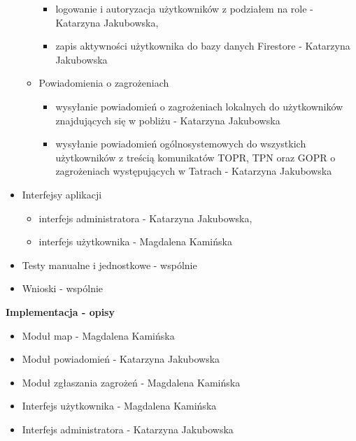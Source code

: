 \begin{itemize}
\begin{itemize}[label=$\circ$]
\begin{itemize}
                \item logowanie i autoryzacja użytkowników z podziałem na role - Katarzyna Jakubowska,
                \item zapis aktywności użytkownika do bazy danych Firestore - Katarzyna Jakubowska
            \end{itemize}
            \item Powiadomienia o zagrożeniach
            \begin{itemize}
                \item wysyłanie powiadomień o zagrożeniach lokalnych do użytkowników znajdujących się w pobliżu - Katarzyna Jakubowska
                \item wysyłanie powiadomień ogólnosystemowych do wszystkich użytkowników z treścią komunikatów TOPR, TPN oraz GOPR o zagrożeniach występujących w Tatrach - Katarzyna Jakubowska
            \end{itemize}
        \end{itemize}
        \item Interfejsy aplikacji
        \begin{itemize}[label=$\circ$]
            \item interfejs administratora - Katarzyna Jakubowska,
            \item interfejs użytkownika - Magdalena Kamińska
        \end{itemize}
        \item Testy manualne i jednostkowe - wspólnie
        \item Wnioski - wspólnie
        \end{itemize}

    \textbf{Implementacja - opisy}
    \begin{itemize}
        \item Moduł map - Magdalena Kamińska
        \item Moduł powiadomień - Katarzyna Jakubowska
        \item Moduł zgłaszania zagrożeń - Magdalena Kamińska
        \item Interfejs użytkownika - Magdalena Kamińska
        \item Interfejs administratora - Katarzyna Jakubowska
    \end{itemize}

    \newpage